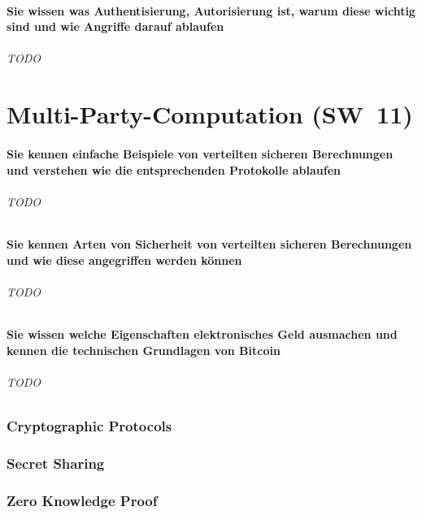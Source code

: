 \documentclass[10pt,a4paper]{article}
\begin{document}
\subsection*{Sie wissen was Authentisierung, Autorisierung ist, warum diese wichtig sind und wie Angriffe darauf ablaufen}
\paragraph*{TODO}


\part{Multi-Party-Computation (SW~11)}
\subsection*{Sie kennen einfache Beispiele von verteilten sicheren Berechnungen und verstehen wie die entsprechenden Protokolle ablaufen}
\paragraph*{TODO}
\subsection*{Sie kennen Arten von Sicherheit von verteilten sicheren Berechnungen und wie diese angegriffen werden können}
\paragraph*{TODO}
\subsection*{Sie wissen welche Eigenschaften elektronisches Geld ausmachen und kennen die technischen Grundlagen von Bitcoin}
\paragraph*{TODO}


\section{Cryptographic Protocols}
\section{Secret Sharing}
\section{Zero Knowledge Proof}
\end{document}
